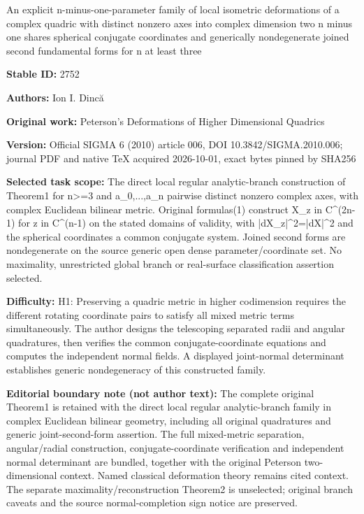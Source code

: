 \documentclass[11pt]{article}
\begin{document}
\begin{center}\Large An explicit n-minus-one-parameter family of local isometric deformations of a complex quadric with distinct nonzero axes into complex dimension two n minus one shares spherical conjugate coordinates and generically nondegenerate joined second fundamental forms for n at least three\end{center}
\noindent\textbf{Stable ID:} 2752\par
\noindent\textbf{Authors:} Ion I. Dincă\par
\noindent\textbf{Original work:} Peterson's Deformations of Higher Dimensional Quadrics\par
\noindent\textbf{Version:} Official SIGMA 6 (2010) article 006, DOI 10.3842/SIGMA.2010.006; journal PDF and native TeX acquired 2026-10-01, exact bytes pinned by SHA256\par
\noindent\textbf{Selected task scope:} The direct local regular analytic-branch construction of Theorem1 for n>=\allowbreak{}3 and a\_0,...,a\_n pairwise distinct nonzero complex axes, with complex Euclidean bilinear metric. Original formulas(1) construct X\_z in C\textasciicircum{}(2n-1) for z in C\textasciicircum{}(n-1) on the stated domains of validity, with |dX\_z|\textasciicircum{}2=\allowbreak{}|dX|\textasciicircum{}2 and the spherical coordinates a common conjugate system. Joined second forms are nondegenerate on the source generic open dense parameter/coordinate set. No maximality, unrestricted global branch or real-surface classification assertion selected.\par
\noindent\textbf{Difficulty:} H1: Preserving a quadric metric in higher codimension requires the different rotating coordinate pairs to satisfy all mixed metric terms simultaneously. The author designs the telescoping separated radii and angular quadratures, then verifies the common conjugate-coordinate equations and computes the independent normal fields. A displayed joint-normal determinant establishes generic nondegeneracy of this constructed family.\par
\noindent\textbf{Editorial boundary note (not author text):} The complete original Theorem1 is retained with the direct local regular analytic-branch family in complex Euclidean bilinear geometry, including all original quadratures and generic joint-second-form assertion. The full mixed-metric separation, angular/radial construction, conjugate-coordinate verification and independent normal determinant are bundled, together with the original Peterson two-dimensional context. Named classical deformation theory remains cited context. The separate maximality/reconstruction Theorem2 is unselected; original branch caveats and the source normal-completion sign notice are preserved.\par
\end{document}
